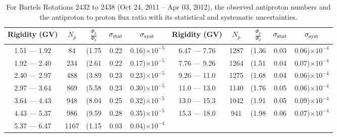\begin{table}[p] 
\renewcommand\baselinestretch{1.3}\selectfont
\setlength\tabcolsep{3pt}
\centering
\begin{tabular}{ccccc | ccccc}
\hline
\textbf{Rigidity}  (GV)  & $N_{\bar{p}}$ & $\frac{\Phi_{\bar{p}}}{\Phi_{p}}$ & $\sigma_{\rm{stat}}$ & $\sigma_{\rm{syst}}$ \hspace{1cm}   & \textbf{Rigidity}  (GV)  & $N_{\bar{p}}$ & $\frac{\Phi_{\bar{p}}}{\Phi_{p}}$ & $\sigma_{\rm{stat}}$ & $\sigma_{\rm{syst}}$ \hspace{1cm} \\ 
\hline
1.51 — 1.92   &  84                  &(1.75                          &  0.22              &      0.16)$\times 10^{-5}$  & 6.47 — 7.76                &  1287                    &(1.36                                &  0.03                   &      0.06)$\times 10^{-4}$\\
1.92 — 2.40   &  234                &(2.61                          &  0.22              &      0.17)$\times 10^{-5}$  & 7.76 — 9.26                &  1264                    &(1.51                                &  0.04                   &      0.07)$\times 10^{-4}$\\
2.40 — 2.97   &  488                &(3.89                          &  0.23              &      0.23)$\times 10^{-5}$  & 9.26 — 11.0                &  1275                    &(1.68                                &  0.04                   &      0.06)$\times 10^{-4}$\\    
2.97 — 3.64   &  869                &(5.58                          &  0.23              &      0.30)$\times 10^{-5}$  & 11.0 — 13.0                 &  1140                   &(1.76                                &  0.05                   &      0.06)$\times 10^{-4}$\\    
3.64 — 4.43   &  948                &(8.04                          &  0.25              &      0.32)$\times 10^{-5}$  & 13.0 — 15.3               &  1042                    &(1.91                                &  0.05                   &      0.09)$\times 10^{-4}$\\
4.43 — 5.37   &  986                &(9.59                          &  0.28              &      0.35)$\times 10^{-5}$  & 15.3 — 18.0               &  941                      &(1.98                                &  0.06                   &      0.07)$\times 10^{-4}$\\
5.37 — 6.47   &  1167              &(1.15                          &  0.03              &      0.04)$\times 10^{-4}$  & \\
\hline
\end{tabular}
\caption[Antiproton to proton flux ratio for Bartels Rotations 2432 to 2438]{For Bartels Rotations 2432 to 2438 (Oct 24, 2011 – Apr 03, 2012), the observed antiproton numbers and the antiproton to proton flux ratio with its statistical and systematic uncertainties.}
\label{TableOfDependent2}
\end{table}


